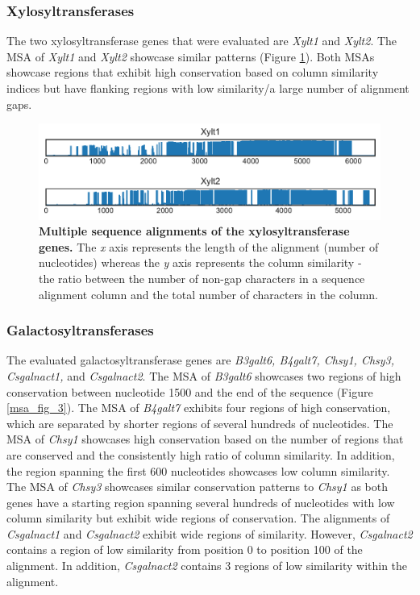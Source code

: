 \documentclass{article}
\begin{document}
\subsubsection{Xylosyltransferases}
The two xylosyltransferase genes that were evaluated are \textit{Xylt1} and \textit{Xylt2}. The MSA of \textit{Xylt1} and \textit{Xylt2} showcase similar patterns (Figure \ref{msa_fig_2}). Both MSAs showcase regions that exhibit high conservation based on column similarity indices but have flanking regions with low similarity/a large number of alignment gaps.

\begin{figure}
\centering
\includegraphics[width=\textwidth]{./images/xylosyltransferase_msa.pdf}
\caption{\textbf{Multiple sequence alignments of the xylosyltransferase genes.} The \textit{x} axis represents the length of the alignment (number of nucleotides) whereas the \textit{y} axis represents the column similarity - the ratio between the number of non-gap characters in a sequence alignment column and the total number of characters in the column.}
\label{msa_fig_2}
\end{figure}

\subsubsection{Galactosyltransferases}
The evaluated galactosyltransferase genes are \textit{B3galt6, B4galt7, Chsy1, Chsy3, Csgalnact1,} and \textit{Csgalnact2}. The MSA of \textit{B3galt6} showcases two regions of high conservation between nucleotide 1500 and the end of the sequence (Figure \ref{msa_fig_3}). The MSA of \textit{B4galt7} exhibits four regions of high conservation, which are separated by shorter regions of several hundreds of nucleotides. The MSA of \textit{Chsy1} showcases high conservation based on the number of regions that are conserved and the consistently high ratio of column similarity. In addition, the region spanning the first 600 nucleotides showcases low column similarity. The MSA of \textit{Chsy3} showcases similar conservation patterns to \textit{Chsy1} as both genes have a starting region spanning several hundreds of nucleotides with low column similarity but exhibit wide regions of conservation. The alignments of \textit{Csgalnact1} and \textit{Csgalnact2} exhibit wide regions of similarity. However, \textit{Csgalnact2} contains a region of low similarity from position 0 to position 100 of the alignment. In addition, \textit{Csgalnact2} contains 3 regions of low similarity within the alignment. 
\end{document}
